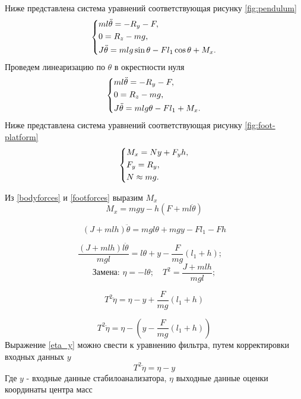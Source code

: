 \documentclass[a4paper,12pt, openany]{book}
\theoremstyle{plain} %
\theoremstyle{definition} %
\theoremstyle{remark} %
\numberwithin{equation}{chapter}
\begin{document}
{Ниже представлена система уравнений соответствующая рисунку \ref{fig:pendulum}
\begin{equation}\label{bodyforces}
    \left\{ {\begin{aligned}
                 & ml\ddot{\theta} = -R_y-F , \hfill                             \\
                 & 0=R_z-mg, \hfill                                              \\
                 & J \ddot{\theta} = mlg\sin \theta-Fl_1\cos \theta+M_x . \hfill \\
            \end{aligned}} \right.
\end{equation}
Проведем линеаризацию по $\theta$ в окрестности нуля
\begin{equation}\label{bodyforces}
    \left\{ {\begin{aligned}
                 & ml\ddot{\theta} = -R_y-F , \hfill             \\
                 & 0=R_z-mg, \hfill                              \\
                 & J \ddot{\theta} = mlg\theta-Fl_1+M_x . \hfill \\
            \end{aligned}} \right.
\end{equation}
Ниже представлена система уравнений соответствующая рисунку \ref{fig:foot-platform}
\begin{equation}\label{footforces}
    \left\{ {\begin{aligned}
                 & M_x = Ny+F_yh , \hfill \\
                 & F_y = R_y , \hfill     \\
                 & N \approx mg . \hfill  \\
            \end{aligned}} \right.
\end{equation}

Из \eqref{bodyforces} и \eqref{footforces} выразим $M_x$
$$M_x=mgy-h\left(F+ml\ddot{\theta}\right)$$

$$\left(J+mlh\right)\ddot{\theta}=mgl\theta+mgy-Fl_1-Fh$$


$$\frac{(J+mlh)l\ddot{\theta}}{mgl}=l\theta+y-\frac{F}{mg}(l_1+h);\quad $$
$$\text{Замена: }\eta=-l\theta; \quad T^2=\frac{J+mlh}{mgl};$$

\[
    T^2\ddot{\eta}=\eta-y+\frac{F}{mg}(l_1+h)
\]

\begin{equation}\label{eta_y}
    T^2\ddot{\eta}=\eta-(y-\frac{F}{mg}(l_1+h))
\end{equation}
Выражение \eqref{eta_y} можно свести к уравнению фильтра, путем корректировки входных данных $y$
\begin{equation}\label{eta_y_clear}
    T^2\ddot{\eta}=\eta-y
\end{equation}
Где $y$ - входные данные стабилоанализатора, $\eta$ выходные данные оценки координаты центра масс

}
\end{document}
